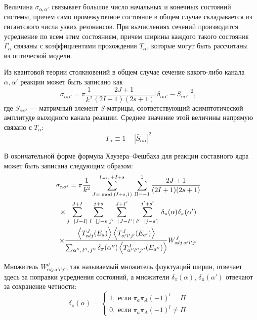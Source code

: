 Величина $\sigma_{\alpha,\alpha'}$ связывает большое число начальных и конечных состояний системы, причем само промежуточное состояние в общем случае складывается из гигантского числа узких резонансов. При вычислениях сечений производится усреднение по всем этим состояниям, причем ширины каждого такого состояния $\Gamma_\alpha$ связаны с коэффициентами прохождения $T_\alpha$, которые могут быть рассчитаны из оптической модели.

Из квантовой теории столкновений в общем случае сечение какого-либо канала $\alpha, \alpha'$ реакции может быть записано как
\begin{equation}
\displaystyle
\sigma_{\alpha \alpha'} = \pi \frac{1}{k^2} 
\frac{2J + 1}{(2I + 1)(2s + 1)}
|\delta_{\alpha \alpha'} - S_{\alpha \alpha'}|^2,
\end{equation}
где $S_{\alpha \alpha'}$ --- матричный элемент $S$-матрицы, соответствующий асимптотической амплитуде выходного канала реакции. Среднее значение этой величины напрямую связано с $T_\alpha$:
\begin{equation}
\displaystyle
T_\alpha \equiv 1 - |\bar{S}_{\alpha\alpha}|^2
\end{equation}

В окончательной форме формула Хаузера--Фешбаха для реакции составного ядра может быть записана следующим образом:
\begin{equation}
\begin{gathered}
\displaystyle
\sigma_{\alpha \alpha^\prime} = 
\pi \frac{1}{k^2}
\sum_{J=\bmod(I + s, 1)}^{l_\text{max} + I + s} \,
\sum_{\Pi=-1}^1 \frac{2J + 1}{(2I + 1)(2s + 1)} \\ \times
\sum_{j=|J-I|}^{J+I} \,
\sum_{l=|j-s}^{j+s} \,
\sum_{j^\prime=|J-I^\prime|}^{J+I^\prime} \,
\sum_{l^\prime=|j-s^\prime|}^{j^\prime+s^\prime} \,
\delta_\pi(\alpha) \delta_\pi(\alpha^\prime) \\ \times
\frac{
  \expval{T_{\alpha l j}^J(E_a)}
  \expval{T_{\alpha^\prime l^\prime j^\prime}^J(E_{a'})}
}{
  \sum_{\alpha'',\, l'',\, j''} \delta_\pi(\alpha'') 
  \expval{T_{\alpha'' l'' j''}^J(E_{a''})}
}
W^J_{\alpha l j \, \alpha' l' j'}
\end{gathered}
\label{eq:talys_cs}
\end{equation}

Множитель $W^J_{\alpha l j \, \alpha' l' j'}$, так называемый множитель флуктуаций ширин, отвечает здесь за поправки усреднения состояний, а множители $\delta_\pi(\alpha)$, $\delta_\pi(\alpha')$ отвечают за сохранение четности:
\begin{equation}
\delta_\pi(\alpha) = \begin{cases}
1, \;\text{если}\; \pi_a \pi_A (-1)^l = \Pi\\
0, \;\text{если}\; \pi_a \pi_A (-1)^l \neq \Pi
\end{cases}
\end{equation}

